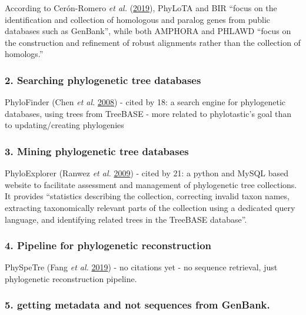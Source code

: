 \documentclass[]{article}
\begin{document}
According to Cerón-Romero \emph{et al.} (\protect\hyperlink{ref-ceron2019phylotol}{2019}), PhyLoTA and BIR ``focus on the identification and collection
of homologous and paralog genes from public databases such as GenBank'', while both AMPHORA and PHLAWD
``focus on the construction and refinement of robust alignments rather than the collection of homologs.''

\hypertarget{searching-phylogenetic-tree-databases}{%
\subsubsection{2. Searching phylogenetic tree databases}\label{searching-phylogenetic-tree-databases}}

PhyloFinder (Chen \emph{et al.} \protect\hyperlink{ref-chen2008phylofinder}{2008}) - cited by 18: a search engine for phylogenetic databases, using
trees from TreeBASE - more related to phylotastic's goal than to updating/creating phylogenies

\hypertarget{mining-phylogenetic-tree-databases}{%
\subsubsection{3. Mining phylogenetic tree databases}\label{mining-phylogenetic-tree-databases}}

PhyloExplorer (Ranwez \emph{et al.} \protect\hyperlink{ref-ranwez2009phyloexplorer}{2009}) - cited by 21: a python and MySQL based website to facilitate
assessment and management of phylogenetic tree collections. It provides ``statistics describing the collection,
correcting invalid taxon names, extracting taxonomically relevant parts of the collection
using a dedicated query language, and identifying related trees in the TreeBASE database''.

\hypertarget{pipeline-for-phylogenetic-reconstruction}{%
\subsubsection{4. Pipeline for phylogenetic reconstruction}\label{pipeline-for-phylogenetic-reconstruction}}

PhySpeTre (Fang \emph{et al.} \protect\hyperlink{ref-fang2019physpetree}{2019}) - no citations yet - no sequence retrieval, just phylogenetic reconstruction
pipeline.

\hypertarget{getting-metadata-and-not-sequences-from-genbank.}{%
\subsubsection{5. getting metadata and not sequences from GenBank.}\label{getting-metadata-and-not-sequences-from-genbank.}}
\end{document}
